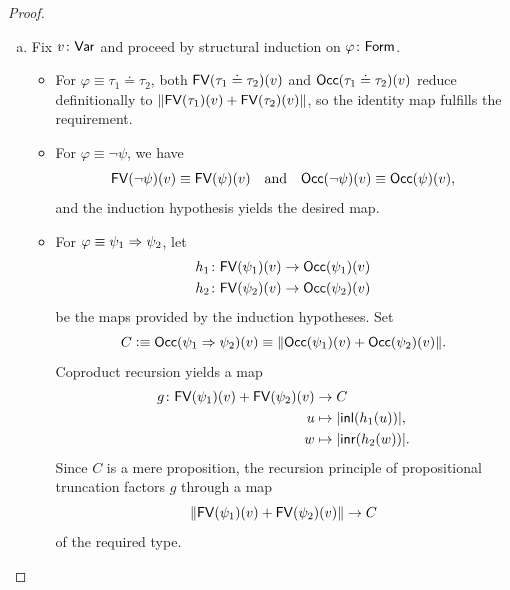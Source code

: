 \begin{proof}
\begin{enumerate}[a),font=\upshape]
\begin{itemize}
\begin{enumerate}[-]
                Combining with $\fun{maxVar}(\psi)\le\max\bigl(y,\fun{maxVar}(\psi)\bigr)$ yields an inhabitant of $C$.
            \end{enumerate}
            Coproduct recursion based on $f_1$ and $f_2$ provides the required map.
        \end{itemize}
        
        \item Fix $v\colon\fun{Var}$ and proceed by structural induction on $\varphi\colon\fun{Form}$.
        \begin{itemize}
            \item For $\varphi\equiv\tau_1\doteq\tau_2$, both $\mathsf{FV}(\tau_1\doteq\tau_2)(v)$ and $\mathsf{Occ}(\tau_1\doteq\tau_2)(v)$ reduce definitionally to $\lVert\mathsf{FV}(\tau_1)(v)+\mathsf{FV}(\tau_2)(v)\rVert$, so the identity map fulfills the requirement.
            
            \item For $\varphi\equiv\neg\psi$, we have 
            \[
                \mathsf{FV}(\neg\psi)(v)
                    \equiv\mathsf{FV}(\psi)(v)
                \quad\text{and}\quad
                \mathsf{Occ}(\neg\psi)(v)
                    \equiv\mathsf{Occ}(\psi)(v),
            \]
            and the induction hypothesis yields the desired map.
            
            \item For $\varphi\equiv\psi_1\mathrel{\Rightarrow}\psi_2$, let \begin{align*}
                h_1&\colon\fun{FV}(\psi_1)(v)
                    \to\fun{Occ}(\psi_1)(v)\\
                h_2&\colon\fun{FV}(\psi_2)(v)
                    \to\fun{Occ}(\psi_2)(v)
            \end{align*}
            be the maps provided by the induction hypotheses. Set
            \[
                C\mathrel{\vcentcolon}\equiv\mathsf{Occ}(\psi_1\mathrel{\Rightarrow}\psi_2)(v)
                    \equiv\lVert
                        \mathsf{Occ}(\psi_1)(v)+\mathsf{Occ}
                            (\psi_2)(v)
                    \rVert.
            \]
            Coproduct recursion yields a map
            \begin{align*}
                g\colon
                    \fun{FV}(\psi_1)(v)+\fun{FV}(\psi_2)(v)
                    &\to
                    C\\
                u&\mapsto\lvert\fun{inl}(h_1(u))\rvert,\\
                w&\mapsto\lvert\fun{inr}(h_2(w))\rvert.
            \end{align*}
            Since $C$ is a mere proposition, the recursion principle of propositional truncation factors $g$ through a map
            \[
            \lVert\mathsf{FV}(\psi_1)(v)+\mathsf{FV}(\psi_2)(v)\rVert\to C
            \]
            of the required type.
            

\end{itemize}
\end{enumerate}
\end{proof}
